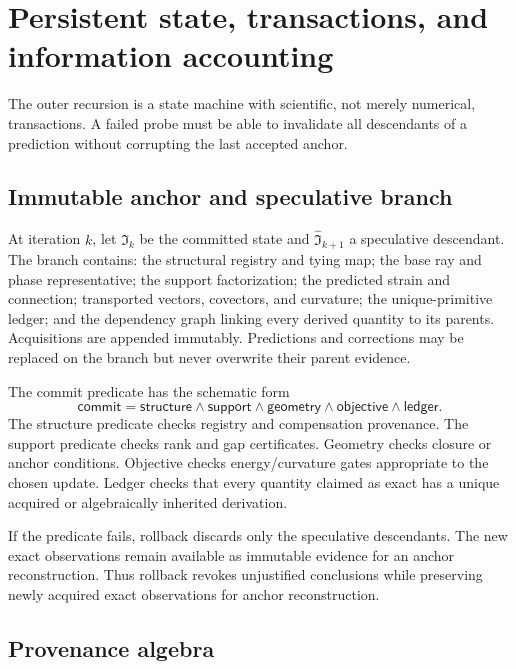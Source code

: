 \documentclass[10pt,twocolumn]{article}
\theoremstyle{definition}
\theoremstyle{remark}
\begin{document}
\section{Persistent state, transactions, and information accounting}
\label{app:transactions}

The outer recursion is a state machine with scientific, not merely numerical,
transactions.  A failed probe must be able to invalidate all descendants of a
prediction without corrupting the last accepted anchor.

\subsection{Immutable anchor and speculative branch}

At iteration $k$, let $\mathfrak I_k$ be the committed state and
$\widehat{\mathfrak I}_{k+1}$ a speculative descendant.  The branch contains:
the structural registry and tying map; the base ray and phase representative;
the support factorization; the predicted strain and connection; transported
vectors, covectors, and curvature; the unique-primitive ledger; and the
dependency graph linking every derived quantity to its parents.  Acquisitions
are appended immutably.  Predictions and corrections may be replaced on the
branch but never overwrite their parent evidence.

The commit predicate has the schematic form
\begin{equation}
 \mathsf{commit}
 =\mathsf{structure}\wedge\mathsf{support}\wedge\mathsf{geometry}
  \wedge\mathsf{objective}\wedge\mathsf{ledger}.
 \label{eq:appcommit}
\end{equation}
The structure predicate checks registry and compensation provenance.  The
support predicate checks rank and gap certificates.  Geometry checks closure
or anchor conditions.  Objective checks energy/curvature gates appropriate to
the chosen update.  Ledger checks that every quantity claimed as exact has a
unique acquired or algebraically inherited derivation.

If the predicate fails, rollback discards only the speculative descendants.
The new exact observations remain available as immutable evidence for
an anchor reconstruction.  Thus rollback revokes unjustified conclusions
while preserving newly acquired exact observations for anchor reconstruction.

\subsection{Provenance algebra}
\end{document}
